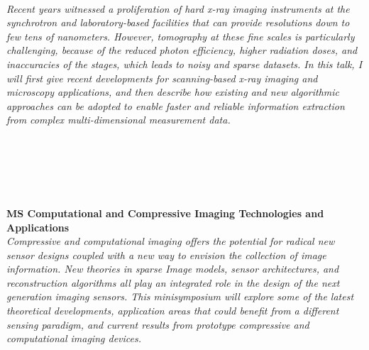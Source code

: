 \begin{multicols}{2}
\\
      \textit{Recent years witnessed a proliferation of hard x-ray imaging instruments at the synchrotron and laboratory-based facilities that can provide resolutions down to few tens of nanometers. However, tomography at these fine scales is particularly challenging, because of the reduced photon efficiency, higher radiation doses, and inaccuracies of the stages, which leads to noisy and sparse datasets. In this talk, I will first give recent developments for scanning-based x-ray imaging and microscopy applications, and then describe how existing and new algorithmic approaches can be adopted to enable faster and reliable information extraction from complex multi-dimensional measurement data. }\\
\\ 
        \\
        \\\\
\\
\end{multicols}
  \noindent\textbf{MS Computational and Compressive Imaging Technologies and Applications}\\
  \textit{Compressive and computational imaging offers the potential for radical new sensor designs coupled with a new way to envision the collection of image information. New theories in sparse Image models, sensor architectures, and reconstruction algorithms all play an integrated role in the design of the next generation imaging sensors. This minisymposium will explore some of the latest theoretical developments, application areas that could benefit from a different sensing paradigm, and current results from prototype compressive and computational imaging devices. } \\
    

